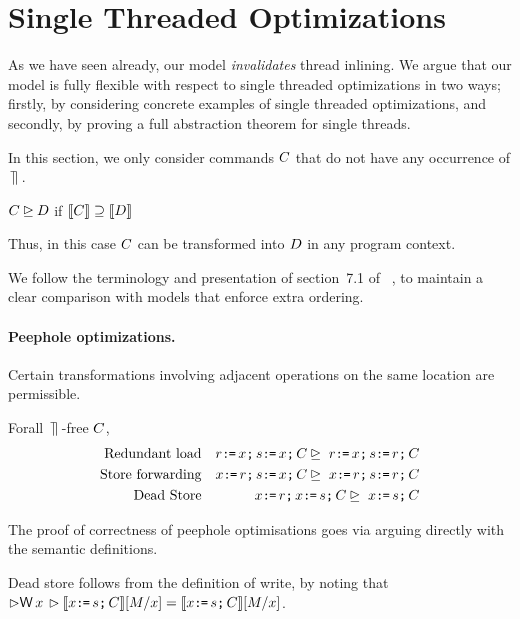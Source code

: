 \newcommand{\rel}{{\tt rel}}


\section{Single Threaded Optimizations}

As we have seen already, our model {\em invalidates} thread inlining.  We argue that our model is fully flexible with respect to single threaded optimizations in two ways; firstly, by considering concrete examples of single threaded optimizations, and secondly, by proving a full abstraction theorem for single threads.  

In this section, we only consider commands $C$ that do not have any occurrence of $\,\mathbin{\rrceil}\,$. 

\begin{definition}
$C \unrhd D$ if $\llbracket C\rrbracket \supseteq \llbracket D\rrbracket$
\end{definition}
Thus, in this case $C$ can be transformed into $D$ in any program context.  

We follow the terminology and presentation of section~7.1 of
~\citet{Dolan:2018:BDR:3192366.3192421}, to maintain a clear comparison with models that enforce extra ordering.

\paragraph*{Peephole optimizations. } 
Certain transformations involving adjacent operations on the same location are permissible. 
 
\begin{lemma}
Forall $\,\mathbin{\rrceil}\,$-free $C$,
\begin{eqnarray*}
\mbox{Redundant load} &&r \texttt{:}\mkern-1mu\texttt{=}\, x \texttt{;}\, s \texttt{:}\mkern-1mu\texttt{=}\, x  \texttt{;}\, C \unrhd\  r \texttt{:}\mkern-1mu\texttt{=}\, x \texttt{;}\, s \texttt{:}\mkern-1mu\texttt{=}\, r \texttt{;}\, C \\
\mbox{Store forwarding} &&
x \texttt{:}\mkern-1mu\texttt{=}\, r \texttt{;}\, s \texttt{:}\mkern-1mu\texttt{=}\, x \texttt{;}\, C\unrhd\ x \texttt{:}\mkern-1mu\texttt{=}\, r \texttt{;}\, s \texttt{:}\mkern-1mu\texttt{=}\, r \texttt{;}\, C \\
\mbox{Dead Store} && x \texttt{:}\mkern-1mu\texttt{=}\, r \texttt{;}\, x \texttt{:}\mkern-1mu\texttt{=}\, s \texttt{;}\, C \unrhd\ x \texttt{:}\mkern-1mu\texttt{=}\, s \texttt{;}\, C
\end{eqnarray*}
\end{lemma}
The proof of correctness of peephole optimisations goes via arguing directly with the semantic definitions.  

Dead store follows from the definition of write, by noting that  $\guard \DW{\aLoc}{} \guard \sem{\aLoc \GETS \bReg \SEMI \aCmd}[\aExp/\aLoc] =  \sem{\aLoc \GETS \bReg \SEMI \aCmd}[\aExp/\aLoc]$. 
  
